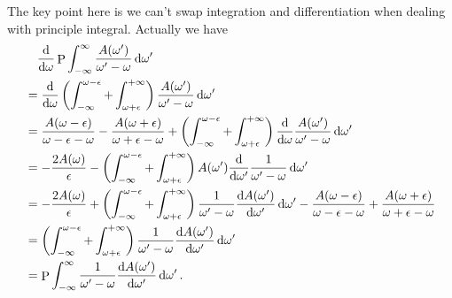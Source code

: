 \documentclass[hyperref, a4paper]{article}
\DeclareMathOperator{\primevalue}{P}
\begin{document}
The key point here is we can't swap integration and differentiation 
when dealing with principle integral. 
Actually we have 
\begin{equation}
    \begin{aligned}
        &\quad \dv{\omega} \primevalue \int_{-\infty}^{\infty} \frac{
            A(\omega')
        }{
            \omega' - \omega
        } \dd{\omega'} \\
        &= 
        \dv{\omega} \left(
            \int_{-\infty}^{\omega - \epsilon} + 
            \int_{\omega + \epsilon}^{+ \infty} 
        \right)
        \frac{
            A(\omega')
        }{
            \omega' - \omega
        } \dd{\omega'} \\
        &= \frac{A(\omega - \epsilon)}{
            \omega - \epsilon - \omega
        }
        - \frac{
            A(\omega + \epsilon)
        }{
            \omega + \epsilon - \omega
        }
        + \left(
            \int_{-\infty}^{\omega - \epsilon} + 
            \int_{\omega + \epsilon}^{+ \infty} 
        \right)
        \dv{\omega}  \frac{
            A(\omega')
        }{
            \omega' - \omega
        } \dd{\omega'} \\
        &= - \frac{2 A(\omega)}{\epsilon} 
        - \left(
            \int_{-\infty}^{\omega - \epsilon} + 
            \int_{\omega + \epsilon}^{+ \infty} 
        \right)
        A(\omega') \dv{\omega'}  \frac{
            1
        }{
            \omega' - \omega
        } \dd{\omega'} \\
        &= - \frac{2 A(\omega)}{\epsilon} 
        + \left(
            \int_{-\infty}^{\omega - \epsilon} + 
            \int_{\omega + \epsilon}^{+ \infty} 
        \right)
        \frac{
            1
        }{
            \omega' - \omega
        } \dv{A(\omega')}{\omega'}   \dd{\omega'}
        - \frac{A(\omega - \epsilon)}{
            \omega - \epsilon - \omega
        }
        + \frac{A(\omega + \epsilon)}{
            \omega + \epsilon - \omega
        } \\
        &= \left(
            \int_{-\infty}^{\omega - \epsilon} + 
            \int_{\omega + \epsilon}^{+ \infty} 
        \right)
        \frac{
            1
        }{
            \omega' - \omega
        } \dv{A(\omega')}{\omega'}   \dd{\omega'} \\
        &= 
        \primevalue \int_{-\infty}^{\infty} 
        \frac{
            1
        }{
            \omega' - \omega
        } \dv{A(\omega')}{\omega'}   \dd{\omega'}.
    \end{aligned}
\end{equation}
\end{document}
